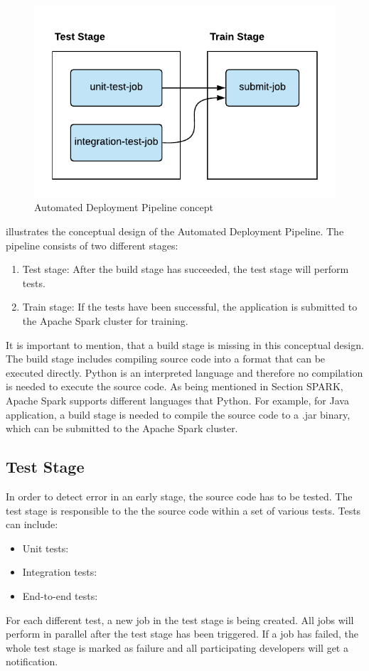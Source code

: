\begin{figure}[h]
\centering
\includegraphics[scale=1]{images/05_conceptual_design/automated_deployment_pipeline/ci_cd_concept}
\caption{Automated Deployment Pipeline concept}
\label{fig:05_deployment_concept}
\end{figure}
 illustrates the conceptual design of the Automated Deployment Pipeline.
The pipeline consists of two different stages:
\begin{enumerate}
\item Test stage: After the build stage has succeeded, the test stage will perform tests.
\item Train stage: If the tests have been successful, the application is submitted to the Apache Spark cluster for training.
\end{enumerate}
It is important to mention, that a build stage is missing in this conceptual design. The build stage includes compiling source code into a format that can be executed directly.
Python is an interpreted language and therefore no compilation is needed to execute the source code. 
As being mentioned in Section SPARK, Apache Spark supports different languages that Python.  For example, for Java application, a build stage is needed to compile the source code to a .jar binary, which can be submitted to the Apache Spark cluster.


\subsection{Test Stage}
In order to detect error in an early stage, the source code has to be tested.
The test stage is responsible to the the source code within a set of various tests. Tests can include:
\begin{itemize}
\item Unit tests:
\item Integration tests:
\item End-to-end tests:
\end{itemize}
For each different test, a new job in the test stage is being created. All jobs will perform in parallel after the test stage has been triggered.
If a job has failed, the whole test stage is marked as failure and all participating developers will get a notification.


